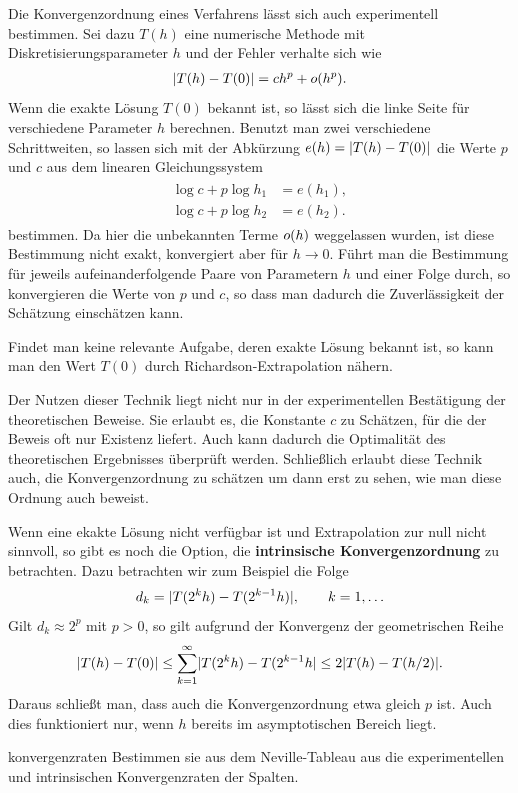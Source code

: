 \begin{remark}
  Die Konvergenzordnung eines
  Verfahrens lässt sich auch experimentell bestimmen. Sei dazu $T(h)$
  eine numerische Methode mit Diskretisierungsparameter $h$ und der
  Fehler verhalte sich wie
  \begin{gather}
    \lvert T(h) - T(0)\rvert = c h^p + o(h^p).
  \end{gather}
  Wenn die exakte Lösung $T(0)$ bekannt ist, so lässt sich die linke
  Seite für verschiedene Parameter $h$ berechnen. Benutzt man zwei
  verschiedene Schrittweiten, so lassen sich mit der Abkürzung
  $e(h) = \lvert T(h) - T(0)\rvert$ die Werte $p$ und $c$ aus dem
  linearen Gleichungssystem
  \begin{gather}
    \begin{aligned}
      \log c + p \log h_1 &= e(h_1),\\
      \log c + p \log h_2 &= e(h_2).
    \end{aligned}
  \end{gather}
  bestimmen. Da hier die unbekannten Terme $o(h)$ weggelassen
  wurden, ist diese Bestimmung nicht exakt, konvergiert aber für
  $h\to 0$. Führt man die Bestimmung für jeweils aufeinanderfolgende
  Paare von Parametern $h$ und einer Folge durch, so konvergieren die
  Werte von $p$ und $c$, so dass man dadurch die Zuverlässigkeit der
  Schätzung einschätzen kann.

  Findet man keine relevante Aufgabe, deren exakte Lösung bekannt ist,
  so kann man den Wert $T(0)$ durch Richardson-Extrapolation nähern.

  Der Nutzen dieser Technik liegt nicht nur in der experimentellen
  Bestätigung der theoretischen Beweise. Sie erlaubt es, die Konstante
  $c$ zu Schätzen, für die der Beweis oft nur Existenz liefert. Auch
  kann dadurch die Optimalität des theoretischen Ergebnisses überprüft
  werden. Schließlich erlaubt diese Technik auch, die
  Konvergenzordnung zu schätzen um dann erst zu sehen, wie man diese
  Ordnung auch beweist.
\end{remark}

\begin{remark}
  Wenn eine ekakte Lösung nicht verfügbar ist und Extrapolation zur
  null nicht sinnvoll, so gibt es noch die Option, die
  \textbf{intrinsische
    Konvergenzordnung} zu
  betrachten. Dazu betrachten wir zum Beispiel die Folge
  \begin{gather}
    d_k = \lvert T(2^kh) - T(2^{k-1}h)\rvert, \qquad k=1,\dots
  \end{gather}
  Gilt $d_k \approx 2^p$ mit $p>0$, so gilt aufgrund der Konvergenz
  der geometrischen Reihe
  \begin{gather}
    \lvert T(h)-T(0)\rvert \le \sum_{k=1}^\infty \lvert T(2^kh) - T(2^{k-1}h\rvert
    \le 2 \lvert T(h)-T(h/2)\rvert.
  \end{gather}
  Daraus schließt man, dass auch die Konvergenzordnung etwa gleich $p$
  ist. Auch dies funktioniert nur, wenn $h$ bereits im asymptotischen
  Bereich liegt.
\end{remark}

\begin{Aufgabe}{konvergenzraten}
  Bestimmen sie aus dem Neville-Tableau aus
   die experimentellen und intrinsischen
  Konvergenzraten der Spalten.
\end{Aufgabe}

